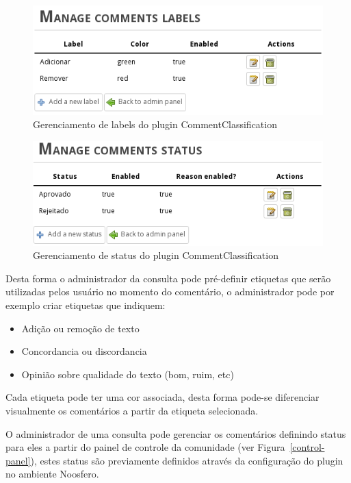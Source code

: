 \documentclass[12pt]{article}
\begin{document}
\begin{figure}[h]
\center
\includegraphics[scale=0.5]{manage-labels.png}
\caption{Gerenciamento de labels do plugin CommentClassification}
\label{manage-labels}
\end{figure}

\begin{figure}[h]
\center
\includegraphics[scale=0.5]{manage-status.png}
\caption{Gerenciamento de status do plugin CommentClassification}
\label{manage-status}
\end{figure}

Desta forma o administrador da consulta pode pré-definir etiquetas que serão
utilizadas pelos usuário no momento do comentário, o administrador pode por
exemplo criar etiquetas que indiquem:

\begin{itemize}
  \item Adição ou remoção de texto
  \item Concordancia ou discordancia
  \item Opinião sobre qualidade do texto (bom, ruim, etc)
\end{itemize}

Cada etiqueta pode ter uma cor associada, desta forma pode-se diferenciar
visualmente os comentários a partir da etiqueta selecionada.

O administrador de uma consulta pode gerenciar os comentários definindo status
para eles a partir do painel de controle da comunidade (ver
Figura~\ref{control-panel}), estes status são previamente definidos através da
configuração do plugin no ambiente Noosfero.
\end{document}
